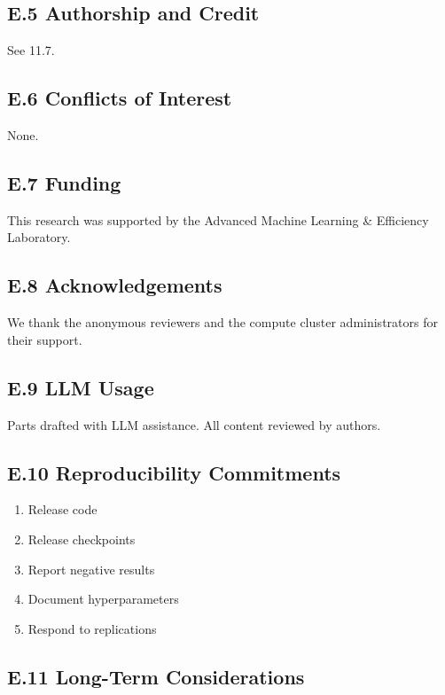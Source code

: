 \subsection{E.5 Authorship and Credit}

See  11.7.

\subsection{E.6 Conflicts of Interest}

None.

\subsection{E.7 Funding}

This research was supported by the Advanced Machine Learning \& Efficiency Laboratory.

\subsection{E.8 Acknowledgements}

We thank the anonymous reviewers and the compute cluster administrators for their support.

\subsection{E.9 LLM Usage}

Parts drafted with LLM assistance. All content reviewed by authors.

\subsection{E.10 Reproducibility Commitments}

\begin{enumerate}
\item Release code
\item Release checkpoints
\item Report negative results
\item Document hyperparameters
\item Respond to replications

\end{enumerate}
\subsection{E.11 Long-Term Considerations}

